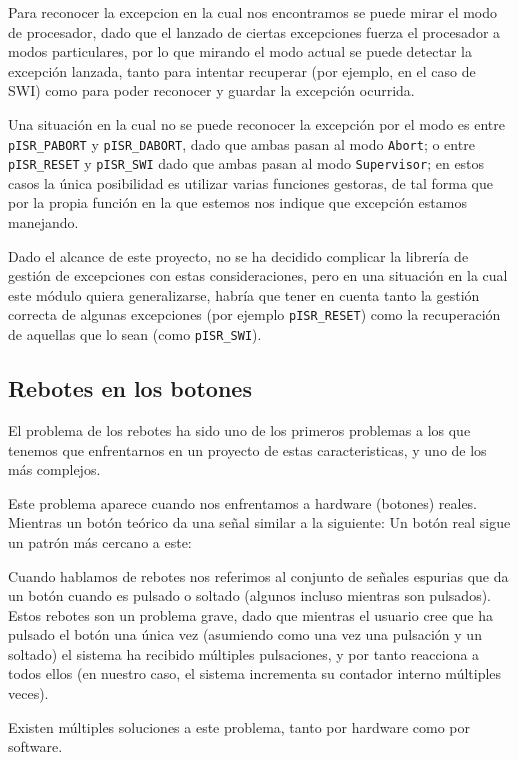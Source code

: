 \documentclass[12pt,letterpaper]{article}
\begin{document}
Para reconocer la excepcion en la cual nos encontramos se puede mirar
el modo de procesador, dado que el lanzado de ciertas excepciones
fuerza el procesador a modos particulares, por lo que mirando el modo
actual se puede detectar la excepción lanzada, tanto para intentar
recuperar (por ejemplo, en el caso de SWI) como para poder reconocer y
guardar la excepción ocurrida.

Una situación en la cual no se puede reconocer la excepción por el
modo es entre \texttt{pISR\_PABORT} y \texttt{pISR\_DABORT}, dado que
ambas pasan al modo \texttt{Abort}; o entre \texttt{pISR\_RESET} y
\texttt{pISR\_SWI} dado que ambas pasan al modo \texttt{Supervisor};
en estos casos la única posibilidad es utilizar varias funciones
gestoras, de tal forma que por la propia función en la que estemos nos
indique que excepción estamos manejando.

Dado el alcance de este proyecto, no se ha decidido complicar la
librería de gestión de excepciones con estas consideraciones, pero en
una situación en la cual este módulo quiera generalizarse, habría que
tener en cuenta tanto la gestión correcta de algunas excepciones (por
ejemplo \texttt{pISR\_RESET}) como la recuperación de aquellas que lo
sean (como \texttt{pISR\_SWI}).

\subsection{Rebotes en los botones}
\label{subsec:rebotes}
El problema de los rebotes ha sido uno de los primeros problemas a los
que tenemos que enfrentarnos en un proyecto de estas caracteristicas,
y uno de los más complejos.

Este problema aparece cuando nos enfrentamos a hardware (botones)
reales. Mientras un botón teórico da una señal similar a la siguiente:
Un botón real sigue un patrón más cercano a este:

Cuando hablamos de rebotes nos referimos al conjunto de señales
espurias que da un botón cuando es pulsado o soltado (algunos incluso
mientras son pulsados). Estos rebotes son un problema grave, dado que
mientras el usuario cree que ha pulsado el botón una única vez
(asumiendo como una vez una pulsación y un soltado) el sistema ha
recibido múltiples pulsaciones, y por tanto reacciona a todos ellos
(en nuestro caso, el sistema incrementa su contador interno múltiples
veces).

Existen múltiples soluciones a este problema, tanto por hardware como
por software.
\end{document}
